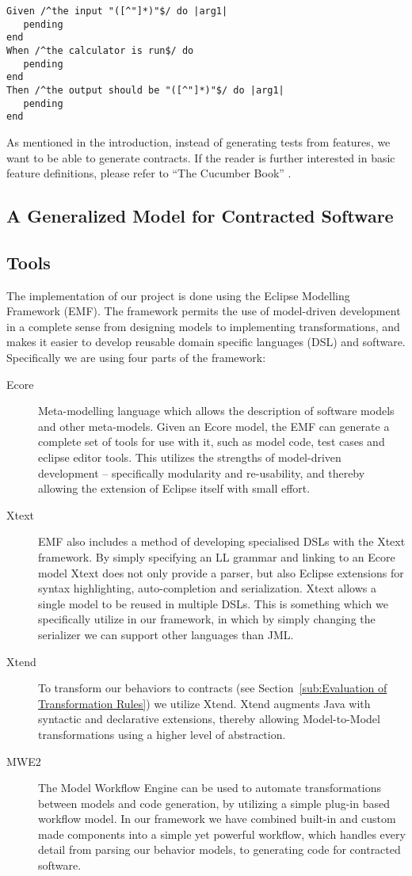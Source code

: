\begin{lstlisting}[caption={Sample Cucumber Output},label={lst:cucumberoutput}]
Given /^the input "([^"]*)"$/ do |arg1|
   pending
end
When /^the calculator is run$/ do
   pending
end
Then /^the output should be "([^"]*)"$/ do |arg1|
   pending
end
\end{lstlisting}

As mentioned in the introduction, instead of generating tests from features, we want to be able to generate contracts. 
If the reader is further interested in basic feature definitions, please refer to “The Cucumber Book” \cite{hellesoy2012}.

\subsection{A Generalized Model for Contracted Software}
\label{sub:AGeneralizedModelforContractedSoftware}

\subsection{Tools}
The implementation of our project is done using the Eclipse Modelling Framework (EMF).
The framework permits the use of model-driven development in a complete sense from designing models to implementing transformations, and makes
it easier to develop reusable domain specific languages (DSL) and software. Specifically we are using four parts of the framework:
\begin{description}
\item[Ecore] Meta-modelling language which allows the description of software models and other meta-models. Given an Ecore model, the EMF can
  generate a complete set of tools for use with it, such as model code, test cases and eclipse editor tools. This utilizes the strengths
  of model-driven development -- specifically modularity and re-usability, and thereby allowing the extension of Eclipse itself with small effort.
\item[Xtext] EMF also includes a method of developing specialised DSLs with the Xtext framework. By simply specifying an LL grammar and linking to an Ecore model
  Xtext does not only provide a parser, but also Eclipse extensions for syntax highlighting, auto-completion and serialization.
  Xtext allows a single model to be reused in multiple DSLs. This is something which we specifically utilize in our framework,
  in which by simply changing the serializer we can support other languages than JML.
\item[Xtend] To transform our behaviors to contracts (see Section~\ref{sub:Evaluation of Transformation Rules}) we utilize Xtend.
  Xtend augments Java with syntactic and declarative extensions, thereby allowing Model-to-Model transformations using a higher level of abstraction.
\item[MWE2] The Model Workflow Engine can be used to automate transformations between models and code generation, by utilizing a simple plug-in based
  workflow model. In our framework we have combined built-in and custom made components into a simple yet powerful workflow, which handles every detail
  from parsing our behavior models, to generating code for contracted software.
\end{description}
